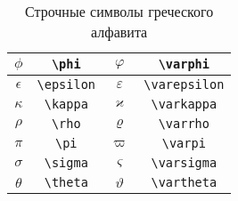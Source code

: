 \begin{table}
	\begin{tabular}{|c|c||c|c|}
		\hline $\phi$ & \Verb|\phi| & $\varphi$ & \Verb|\varphi| \\
		\hline $\epsilon$ & \Verb|\epsilon| & $\varepsilon$ & \Verb|\varepsilon| \\
		\hline $\kappa$ & \Verb|\kappa| & $\varkappa$ & \Verb|\varkappa| \\
		\hline $\rho$ & \Verb|\rho| & $\varrho$ & \Verb|\varrho| \\
		\hline $\pi$ & \Verb|\pi| & $\varpi$ & \Verb|\varpi| \\
		\hline $\sigma$ & \Verb|\sigma| & $\varsigma$ & \Verb|\varsigma| \\
		\hline $\theta$ & \Verb|\theta| & $\vartheta$ & \Verb|\vartheta| \\
		\hline
	\end{tabular}
	\caption{Строчные символы греческого алфавита}
\end{table}